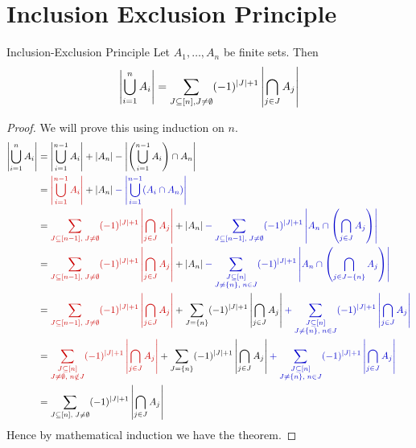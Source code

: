 \documentclass[twoside]{article}
\begin{document}
\section{Inclusion Exclusion Principle}
\begin{Theorem}{Inclusion-Exclusion Principle}{}
	Let $A_1,\dots, A_n$ be finite sets. Then $$\left|\bigcup_{i=1}^nA_i\right|=\sum_{J\subseteq [n], J\neq\emptyset}(-1)^{|J|+1}\left|\bigcap_{j\in J}A_j\right|$$
\end{Theorem}
\begin{proof}
	We will prove this using induction on $n$.\begin{align*}
		\lt|\bigcup\limits_{i=1}^{n}A_i\rt| & = \lt|\bigcup_{i=1}^{n-1} A_i\rt|+  |A_{n}|-  \lt|\lt(\bigcup_{i=1}^{n-1} A_i \rt)\cap A_{n}\rt|                                                                                                                                                                                                  \\
		& =  \mathcolor{red!80!black}{\lt|\bigcup\limits_{i=1}^{n-1}A_i\rt|}+|A_n|\mathcolor{blue!80!black}{-\lt|\bigcup_{i=1}^{n-1}(A_i\cap A_n)   \rt|                                                                                                                     }                                       \\
		& = \mathcolor{red!80!black}{\sum_{J\subseteq [n-1],\; J\neq\emptyset}(-1)^{|J|+1}\lt|\bigcap_{j\in J}A_j\rt| }+|A_n|\mathcolor{blue!80!black}{-\sum_{J\subseteq[n-1],\; J\neq\emptyset} (-1)^{|J|+1}\lt|A_n\cap\lt(\bigcap_{j\in J}A_j\rt)\rt|    }                                                               \\
		& =  \mathcolor{red!80!black}{\sum_{J\subseteq [n-1],\; J\neq\emptyset}(-1)^{|J|+1}\lt|\bigcap_{j\in J}A_j\rt| }+|A_n|\mathcolor{blue!80!black}{-\sum_{\substack{J\subseteq[n]\\ J\neq\{n\},\; n\in J}} (-1)^{|J|+1}\lt|A_n\cap\lt(\bigcap_{j\in J-\{n\}}A_j\rt)\rt|                     }                         \\
		& = \mathcolor{red!80!black}{ \sum_{J\subseteq [n-1],\; J\neq\emptyset}(-1)^{|J|+1}\lt|\bigcap_{j\in J}A_j\rt|       }   +\sum_{J=\{n\}}(-1)^{|J|+1}\lt|\bigcap_{j\in J} A_j \rt|       \mathcolor{blue!80!black}{+\sum_{\substack{J\subseteq[n]\\ J\neq\{n\},\; n\in J}} (-1)^{|J|+1}\lt|\bigcap_{j\in J}A_j\rt|}\\
		&= \mathcolor{red!80!black}{ \sum_{\substack{J\subseteq [n]\\J\neq\emptyset,\; n\notin J}}(-1)^{|J|+1}\lt|\bigcap_{j\in J}A_j\rt|       }   +\sum_{J=\{n\}}(-1)^{|J|+1}\lt|\bigcap_{j\in J} A_j \rt|       \mathcolor{blue!80!black}{+\sum_{\substack{J\subseteq[n]\\ J\neq\{n\},\; n\in J}} (-1)^{|J|+1}\lt|\bigcap_{j\in J}A_j\rt|}\\
		&= \sum_{J\subseteq [n],\; J\neq\emptyset}(-1)^{|J|+1}\lt|\bigcap_{j\in J}A_j\rt|
	\end{align*}
	Hence by mathematical induction we have the theorem.
\end{proof}
\end{document}
